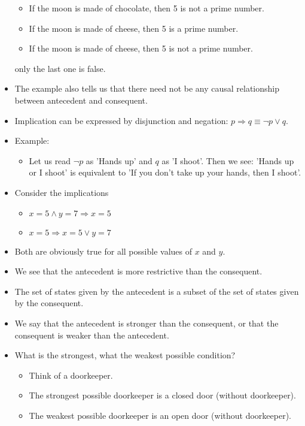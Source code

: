 \begin{multicols}{2}
\begin{itemize}
\begin{itemize}
    \item If the moon is made of chocolate, then 5 is not a prime number.
    \item If the moon is made of cheese, then 5 is a prime number.
    \item If the moon is made of cheese, then 5 is not a prime number.
  \end{itemize}
  only the last one is false.
  \item The example also tells us that there need not be any causal relationship between antecedent and consequent.
  \item Implication can be expressed by disjunction and negation: $p \Rightarrow q \equiv \neg p \lor q$.
  \item Example:
  \begin{itemize}
    \item Let us read $\neg p$ as 'Hands up' and $q$ as 'I shoot'. Then we see: 'Hands up or I shoot' is equivalent to 'If you don't take up your hands, then I shoot'.
  \end{itemize}
  \item Consider the implications
  \begin{itemize}
    \item $x=5 \land y=7 \Rightarrow x=5$
    \item $x=5 \Rightarrow x=5 \lor y=7$
  \end{itemize}
  \item Both are obviously true for all possible values of $x$ and $y$.
  \item We see that the antecedent is more restrictive than the consequent.
  \item The set of states given by the antecedent is a subset of the set of states given by the consequent.
  \item We say that the antecedent is stronger than the consequent, or that the consequent is weaker than the antecedent.
  \item What is the strongest, what the weakest possible condition?
  \begin{itemize}
    \item Think of a doorkeeper.
    \item The strongest possible doorkeeper is a closed door (without doorkeeper).
    \item The weakest possible doorkeeper is an open door (without doorkeeper).
  \end{itemize}
\end{itemize}


\end{multicols}
